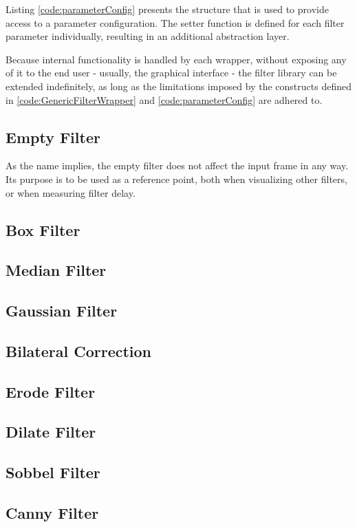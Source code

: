 Listing \ref{code:parameterConfig} presents the structure that is used to provide access to a parameter
configuration. The setter function is defined for each filter parameter individually, resulting in an
additional abstraction layer.

Because internal functionality is handled by each wrapper, without exposing any of it to the end
user - usually, the graphical interface - the filter library can be extended indefinitely, as long as
the limitations imposed by the constructs defined in \ref{code:GenericFilterWrapper} and 
\ref{code:parameterConfig} are adhered to.

\subsection{Empty Filter}

As the name implies, the empty filter does not affect the input frame in any way. Its purpose is to be
used as a reference point, both when visualizing other filters, or when measuring filter delay.

\subsection{Box Filter}
\subsection{Median Filter}
\subsection{Gaussian Filter}
\subsection{Bilateral Correction}
\subsection{Erode Filter}
\subsection{Dilate Filter}
\subsection{Sobbel Filter}
\subsection{Canny Filter}
